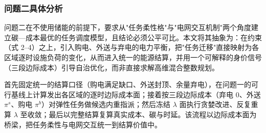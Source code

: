 \subsubsection{问题二具体分析}

问题二在不使用储能的前提下，要求从"任务柔性格"与"电网交互机制"两个角度建立碳—成本最优的任务调度\cite{radovanovic2021carbon,goiri2015renewable}模型，且结论必须公平可比。本文将其抽象为：在约束（式 2--4）之上，引入购电、外送与弃电的电力平衡，把"任务迁移"直接映射为各区域逐时设施负荷的变化，从而进入统一的能源结算，并用一个可解释的身价信号（三段边际成本）引导自治优化，而非直接求解高维混合整数规划。

首先固定统一的结算口径（购电满足缺口、外送封顶、余量弃电），在问题一的可行基线上计算发出各区域的逐时边际成本面；接着按三段边际成本（弃电 0、外送 $\pi^s$、购电 $\pi^b$）对弹性任务做候选内重指派；然后冻结 $\lambda$ 面执行贪婪改进、反复重算 $\lambda$ 至收敛；最后以完整结算复算真实成本、碳与时延。该流程以边际成本面为桥梁，把任务柔性与电网交互统一到结算价值中。
